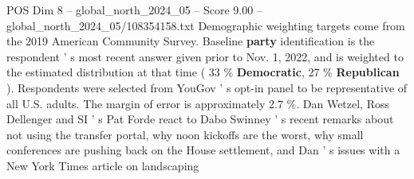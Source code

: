 \begin{textsample}{POS Dim 8 – global\_north\_2024\_05 – Score 9.00 – global\_north\_2024\_05/108354158.txt}
Demographic weighting targets come from the 2019 American Community Survey.
Baseline \textbf{party} identification is the respondent ' s most recent answer given prior to Nov. 1, 2022, and is weighted to the estimated distribution at that time ( 33 \% \textbf{Democratic}, 27 \% \textbf{Republican} ).
Respondents were selected from YouGov ' s opt-in panel to be representative of all U.S. adults.
The margin of error is approximately 2.7 \%.
Dan Wetzel, Ross Dellenger and SI ' s Pat Forde react to Dabo Swinney ' s recent remarks about not using the transfer portal, why noon kickoffs are the worst, why small conferences are pushing back on the House settlement, and Dan ' s issues with a New York Times article on landscaping

\end{textsample}

